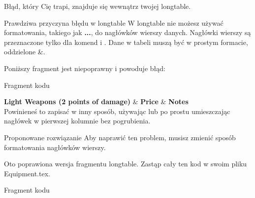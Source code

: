 Błąd, który Cię trapi, znajduje się wewnątrz twojej longtable.

Prawdziwa przyczyna błędu w longtable
W longtable nie możesz używać formatowania, takiego jak \textbf{...}, do nagłówków wierszy danych. Nagłówki wierszy są przeznaczone tylko dla komend \endfirsthead i \endhead. Dane w tabeli muszą być w prostym formacie, oddzielone &.

Poniższy fragment jest niepoprawny i powoduje błąd:

Fragment kodu

\textbf{Light Weapons (2 points of damage)} & \textbf{Price} & \textbf{Notes} \\ \hline
Powinieneś to zapisać w inny sposób, używając \multicolumn lub po prostu umieszczając nagłówek w pierwszej kolumnie bez pogrubienia.

Proponowane rozwiązanie
Aby naprawić ten problem, musisz zmienić sposób formatowania nagłówków wierszy.

Oto poprawiona wersja fragmentu longtable. Zastąp cały ten kod w swoim pliku Equipment.tex.

Fragment kodu

